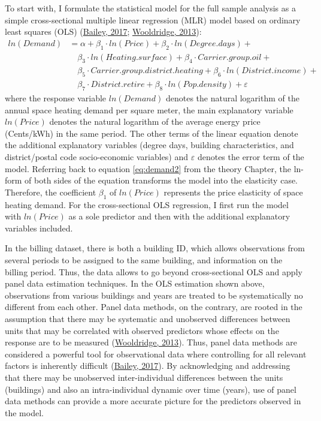 \documentclass[12pt,twoside]{reedthesis}
\begin{document}
To start with, I formulate the statistical model for the full sample analysis as a simple cross-sectional multiple linear regression (MLR) model based on ordinary least squares (OLS) (\protect\hyperlink{ref-bailey17}{Bailey, 2017}; \protect\hyperlink{ref-wooldridge13}{Wooldridge, 2013}):
\begin{align*}
ln(Demand) & = \alpha + \beta_1 \cdot ln(Price) + \beta_2 \cdot ln(Degree.days) + \\
 & \quad \beta_3 \cdot ln(Heating.surface) + \beta_{4} \cdot Carrier.group.oil + \\
 & \quad \beta_{5} \cdot Carrier.group.district.heating + \beta_{6} \cdot ln(District.income) + \\
 & \quad \beta_{7} \cdot District.retire + \beta_{8} \cdot ln(Pop.density) + \varepsilon 
\end{align*}
where the response variable \(ln(Demand)\) denotes the natural logarithm of the annual space heating demand per square meter, the main explanatory variable \(ln(Price)\) denotes the natural logarithm of the average energy price (Cents/kWh) in the same period. The other terms of the linear equation denote the additional explanatory variables (degree days, building characteristics, and district/postal code socio-economic variables) and \(\varepsilon\) denotes the error term of the model. Referring back to equation \eqref{eq:demand2} from the theory Chapter, the ln-form of both sides of the equation transforms the model into the elasticity case. Therefore, the coefficient \(\beta_1\) of \(ln(Price)\) represents the price elasticity of space heating demand. For the cross-sectional OLS regression, I first run the model with \(ln(Price)\) as a sole predictor and then with the additional explanatory variables included.

In the billing dataset, there is both a building ID, which allows observations from several periods to be assigned to the same building, and information on the billing period. Thus, the data allows to go beyond cross-sectional OLS and apply panel data estimation techniques. In the OLS estimation shown above, observations from various buildings and years are treated to be systematically no different from each other. Panel data methods, on the contrary, are rooted in the assumption that there may be systematic and unobserved differences between units that may be correlated with observed predictors whose effects on the response are to be measured (\protect\hyperlink{ref-wooldridge13}{Wooldridge, 2013}). Thus, panel data methods are considered a powerful tool for observational data where controlling for all relevant factors is inherently difficult (\protect\hyperlink{ref-bailey17}{Bailey, 2017}). By acknowledging and addressing that there may be unobserved inter-individual differences between the units (buildings) and also an intra-individual dynamic over time (years), use of panel data methods can provide a more accurate picture for the predictors observed in the model.
\end{document}
